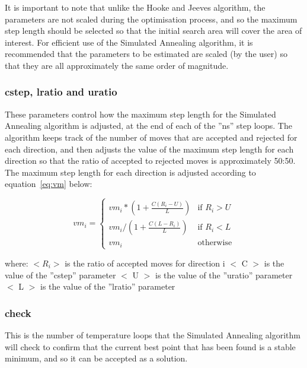 \documentclass [a4paper, 10pt]{book}
\begin{document}
\bigskip
It is important to note that unlike the Hooke and Jeeves algorithm, the parameters are not scaled during the optimisation process, and so the maximum step length should be selected so that the initial search area will cover the area of interest.  For efficient use of the Simulated Annealing algorithm, it is recommended that the parameters to be estimated are scaled (by the user) so that they are all approximately the same order of magnitude.

\subsubsection{cstep, lratio and uratio}
These parameters control how the maximum step length for the Simulated Annealing algorithm is adjusted, at the end of each of the ''ns'' step loops.  The algorithm keeps track of the number of moves that are accepted and rejected for each direction, and then adjusts the value of the maximum step length for each direction so that the ratio of accepted to rejected moves is approximately 50:50.  The maximum step length for each direction is adjusted according to equation~\ref{eq:vm} below:

\begin{equation}\label{eq:vm}
vm_{i} =
\begin{cases}
  vm_{i} * (1 + \frac{C (R_{i} - U)}{L})
  & \textrm{if $R_{i} > U$}\\
  vm_{i} / (1 + \frac{C (L - R_{i})}{L})
  & \textrm{if $R_{i} < L$}\\
  vm_{i}
  & \textrm{otherwise}
\end{cases}
\end{equation}

where:\newline
$< R_{i} >$ is the ratio of accepted moves for direction i\newline
$<$ C $>$ is the value of the ''cstep'' parameter\newline
$<$ U $>$ is the value of the ''uratio'' parameter\newline
$<$ L $>$ is the value of the ''lratio'' parameter

\subsubsection{check}
This is the number of temperature loops that the Simulated Annealing algorithm will check to confirm that the current best point that has been found is a stable minimum, and so it can be accepted as a solution.
\end{document}
